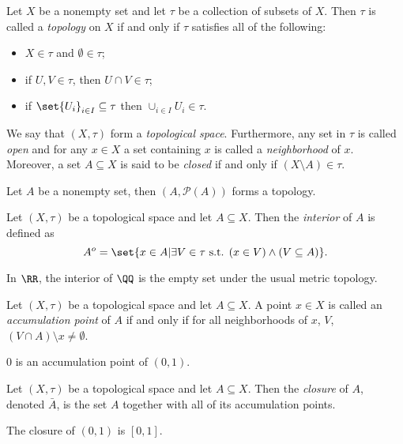 \begin{definition*}
	Let $X$ be a nonempty set and let $\tau$ be a collection of subsets of $X$.
	Then $\tau$ is called a \textit{topology} on $X$ if and only if $\tau$ satisfies all of the following:
	\begin{itemize}
		\item $X\in\tau$ and $\emptyset\in\tau$;
		\item if $U,V\in\tau$, then $U\cap V\in\tau$;
		\item if $\set{U_i}_{i\in I}\subseteq\tau$ then $\cup_{i\in I} U_i\in\tau$.
	\end{itemize}
	We say that $(X,\tau)$ form a \textit{topological space}.
	Furthermore, any set in $\tau$ is called \textit{open} and for any $x\in X$ a set containing $x$ is called a \textit{neighborhood} of $x$.
	Moreover, a set $A\subseteq X$ is said to be \textit{closed} if and only if $(X\setminus A)\in\tau$.
\end{definition*}
\begin{example*}
	Let $A$ be a nonempty set, then $(A,\mathcal{P}(A))$ forms a topology.
\end{example*}

\begin{definition*}
	Let $(X,\tau)$ be a topological space and let $A\subseteq X$.
	Then the \textit{interior} of $A$ is defined as
	\[
	A^o=\set{x\in A|\exists V\in\tau \text{ s.t. }(x\in V)\wedge (V\subseteq A)}. 
	\]
\end{definition*}
\begin{example*}
	In $\RR$, the interior of $\QQ$ is the empty set under the usual metric topology.
\end{example*}

\begin{definition*}
	Let $(X,\tau)$ be a topological space and let $A\subseteq X$.
	A point $x\in X$ is called an \textit{accumulation point} of $A$ if and only if for all neighborhoods of $x$, $V$, $(V\cap A)\setminus{x}\neq\emptyset$.
\end{definition*}
\begin{example*}
	$0$ is an accumulation point of $(0,1)$.
\end{example*}

\begin{definition*}
	Let $(X,\tau)$ be a topological space and let $A\subseteq X$.
	Then the \textit{closure} of $A$, denoted $\bar{A}$, is the set $A$ together with all of its accumulation points.
\end{definition*}
\begin{example*}
	The closure of $(0,1)$ is $[0,1]$.
\end{example*}


